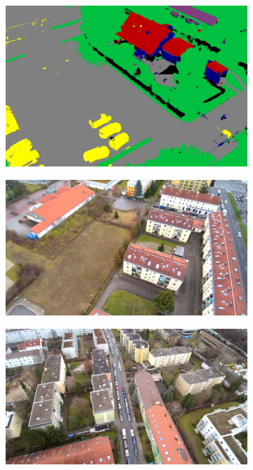 \begin{figure}[H]
\begin{subfigure}[tbp]{0.24\columnwidth}
           \includegraphics[width=\textwidth]{segment/kiga_seg2.png}
           \caption[]{}%
           {{\small }}    
           \label{fig:4h}
       \end{subfigure} 
       \begin{subfigure}[tbp]{0.275\columnwidth}
           \centering
           \includegraphics[width=\textwidth]{segment/mil_ori1.png}
           \caption[]{}
           {{\small }}
           \label{fig:4i}
       \end{subfigure}
       \begin{subfigure}[tbp]{0.275\columnwidth}
           \centering
           \includegraphics[width=\textwidth]{segment/mil_ori2.png}

\end{subfigure}
\end{figure}
